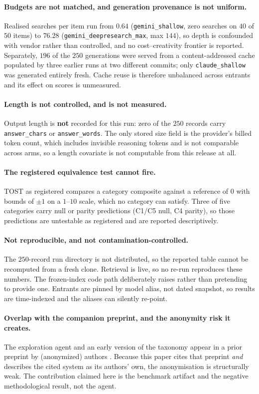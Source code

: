 \paragraph{Budgets are not matched, and generation provenance is not uniform.} Realised searches per
item run from $0.64$ (\texttt{gemini\_shallow}, zero searches on $40$ of $50$ items) to $76.28$
(\texttt{gemini\_deepresearch\_max}, max $144$), so depth is confounded with vendor rather than
controlled, and no cost--creativity frontier is reported. Separately, $196$ of the $250$ generations
were served from a content-addressed cache populated by three earlier runs at two different commits;
only \texttt{claude\_shallow} was generated entirely fresh. Cache reuse is therefore unbalanced across
entrants and its effect on scores is unmeasured.

\paragraph{Length is not controlled, and is not measured.} Output length is \textbf{not} recorded for
this run: zero of the $250$ records carry \texttt{answer\_chars} or \texttt{answer\_words}. The only
stored size field is the provider's billed token count, which includes invisible reasoning tokens and
is not comparable across arms, so a length covariate is not computable from this release at all.

\paragraph{The registered equivalence test cannot fire.} TOST as registered compares a category
composite against a reference of $0$ with bounds of $\pm1$ on a $1$--$10$ scale, which no category can
satisfy. Three of five categories carry null or parity predictions (C1/C5 null, C4 parity), so those predictions are
untestable as registered and are reported descriptively.

\paragraph{Not reproducible, and not contamination-controlled.} The $250$-record run directory is not
distributed, so the reported table cannot be recomputed from a fresh clone. Retrieval is live, so no
re-run reproduces these numbers. The frozen-index code path deliberately raises rather than
pretending to provide one. Entrants are pinned by model alias, not dated snapshot, so results are
time-indexed and the aliases can silently re-point.

\paragraph{Overlap with the companion preprint, and the anonymity risk it creates.} The exploration
agent and an early version of the taxonomy appear in a prior preprint by (anonymized) authors
\citep{caesar2026}. Because this paper cites that preprint \emph{and} describes the cited system as
its authors' own, the anonymisation is structurally weak. The contribution claimed here is the
benchmark artifact and the negative methodological result, not the agent.

